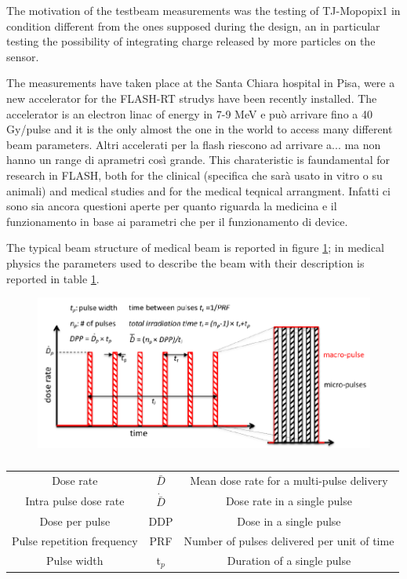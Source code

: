 The motivation of the testbeam measurements was the testing of TJ-Mopopix1 in condition different from the ones supposed during the design, an in particular testing the possibility of integrating charge released by more particles on the sensor.

The measurements have taken place at the Santa Chiara hospital in Pisa, were a new accelerator for the FLASH-RT strudys have been recently installed. 
The accelerator is an electron linac of energy in 7-9 MeV  e può arrivare fino a 40 Gy/pulse and it is the only almost the one in the world to access many different beam parameters. Altri accelerati per la flash riescono ad arrivare a... ma non hanno un range di aprametri così grande. 
This charateristic is faundamental for research in FLASH, both for the clinical (specifica che sarà usato in vitro o su animali) and medical studies and for the medical teqnical arrangment. 
Infatti ci sono sia ancora questioni aperte per quanto riguarda la medicina e il funzionamento in base ai parametri che per il funzionamento di device. 

The typical beam structure of medical beam is reported in figure \ref{fig:}; in medical physics the parameters used to describe the beam with their description is reported in table \ref{tab:}. 
\begin{figure}
   \centering
   \includegraphics[width=.7\linewidth]{figures/test_beam/beam_structure.pdf}
   \caption{}
   \label{fig:}
\end{figure}

\begin{table}
   \begin{center}
   \begin{tabular}{| c | c | c |}
   \hline
   \\
   \hline
   \hline
Dose rate & $\bar{D}$ & Mean dose rate for a multi-pulse delivery\\
Intra pulse dose rate & $\Dot{\bar{D}}$ & Dose rate in a single pulse \\
Dose per pulse & DDP & Dose in a single pulse \\
Pulse repetition frequency & PRF & Number of pulses delivered per unit of time\\
Pulse width & t$_{p}$ & Duration of a single pulse\\
   \hline
   \end{tabular}
   \caption{}
   \label{tab:}
   \end{center}
\end{table}    

